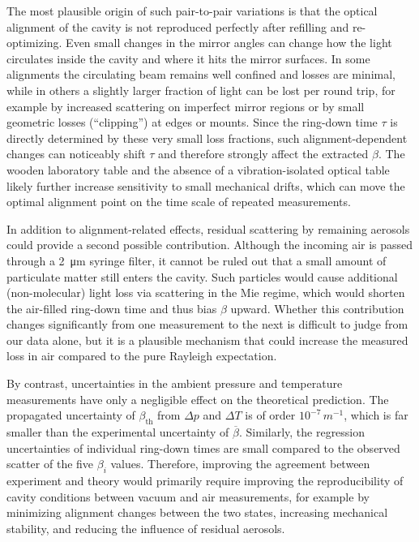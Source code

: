 \documentclass[a4paper]{article}
\begin{document}
The most plausible origin of such pair-to-pair variations is that the optical alignment of the cavity is not reproduced perfectly after refilling and re-optimizing.
Even small changes in the mirror angles can change how the light circulates inside the cavity and where it hits the mirror surfaces.
In some alignments the circulating beam remains well confined and losses are minimal, while in others a slightly larger fraction of light can be lost per round trip, for example by increased scattering on imperfect mirror regions or by small geometric losses (``clipping'') at edges or mounts.
Since the ring-down time $\tau$ is directly determined by these very small loss fractions, such alignment-dependent changes can noticeably shift $\tau$ and therefore strongly affect the extracted $\beta$.
The wooden laboratory table and the absence of a vibration-isolated optical table likely further increase sensitivity to small mechanical drifts, which can move the optimal alignment point on the time scale of repeated measurements.

In addition to alignment-related effects, residual scattering by remaining aerosols could provide a second possible contribution.
Although the incoming air is passed through a \SI{2}{\micro\meter} syringe filter, it cannot be ruled out that a small amount of particulate matter still enters the cavity.
Such particles would cause additional (non-molecular) light loss via scattering in the Mie regime, which would shorten the air-filled ring-down time and thus bias $\beta$ upward.
Whether this contribution changes significantly from one measurement to the next is difficult to judge from our data alone, but it is a plausible mechanism that could increase the measured loss in air compared to the pure Rayleigh expectation.

By contrast, uncertainties in the ambient pressure and temperature measurements have only a negligible effect on the theoretical prediction.
The propagated uncertainty of $\beta_\mathrm{th}$ from $\Delta p$ and $\Delta T$ is of order $10^{-7}\,\si{m^{-1}}$, which is far smaller than the experimental uncertainty of $\overline{\beta}$.
Similarly, the regression uncertainties of individual ring-down times are small compared to the observed scatter of the five $\beta_i$ values.
Therefore, improving the agreement between experiment and theory would primarily require improving the reproducibility of cavity conditions between vacuum and air measurements, for example by minimizing alignment changes between the two states, increasing mechanical stability, and reducing the influence of residual aerosols.
\end{document}
